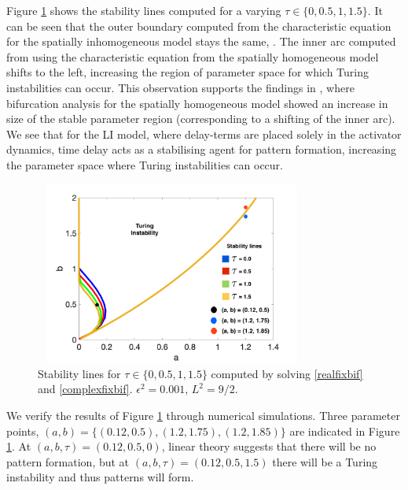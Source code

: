 Figure \ref{fig:tspacetau} shows the stability lines computed for a varying $\tau\in\{0,0.5,1,1.5\}$. It can be seen that the outer boundary computed from the characteristic equation for the spatially inhomogeneous model stays the same, . The inner arc computed from using the characteristic equation from the spatially homogeneous model shifts to the left, increasing the region of parameter space for which Turing instabilities can occur. This observation supports the findings in \cite{william}, where bifurcation analysis for the spatially homogeneous model showed an increase in size of the stable parameter region (corresponding to a shifting of the inner arc). We see that for the LI model, where delay-terms are placed solely in the activator dynamics, time delay acts as a stabilising agent for pattern formation,  increasing the parameter space where Turing instabilities can occur.
\begin{figure}[H]
        \centering
        \includegraphics[width=9cm,height = 6cm]{tspacetau.png}
        \caption{Stability lines for $\tau\in\{0,0.5,1,1.5\}$ computed by solving \eqref{realfixbif} and \eqref{complexfixbif}. $\epsilon^2=0.001$, $L^2=9/2$.}
        \label{fig:tspacetau}
\end{figure}
We verify the results of Figure \ref{fig:tspacetau} through numerical simulations. Three parameter points, $(a,b)=\{(0.12,0.5),(1.2,1.75),(1.2,1.85)\}$ are indicated in Figure \ref{fig:tspacetau}. At $(a,b,\tau)=(0.12,0.5,0)$, linear theory suggests that there will be no pattern formation, but at $(a,b,\tau)=(0.12,0.5,1.5)$ there will be a Turing instability and thus patterns will form.
